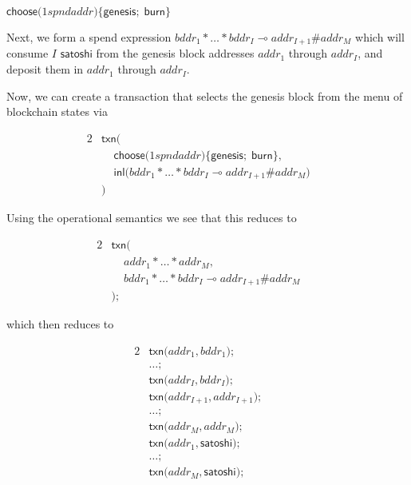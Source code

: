 \documentclass[]{acm_proc_article-sp}
\numberwithin{equation}{subsection}
\begin{document}
$\mathsf{choose}\mathsf{(} 1spndaddr \mathsf{)}\mathsf{\{} \mathsf{genesis}\mathsf{;}\; \mathsf{burn} \mathsf{\}}$

Next, we form a spend expression $bddr_1 * \ldots * bddr_I \multimap addr_{I+1} \# addr_M$ which will consume $I$ $\mathsf{satoshi}$ from the genesis block addresses $addr_1$ through $addr_I$, and deposit them in $addr_1$ through $addr_I$.

Now, we can create a transaction that selects the genesis block from
the menu of blockchain states via

\begin{alignat*}{2}
  &\mathsf{txn}\mathsf{(} && \\
  &\;\;\;\;\mathsf{choose}\mathsf{(} 1spndaddr \mathsf{)}\mathsf{\{} \mathsf{genesis}\mathsf{;}\; \mathsf{burn} \mathsf{\}}, && \\
  &\;\;\;\;\mathsf{inl}\mathsf{(} bddr_1 * \ldots * bddr_I \multimap addr_{I+1} \# addr_M \mathsf{)} && \\
  &\mathsf{)}
\end{alignat*}

Using the operational semantics we see that this reduces to

\begin{alignat*}{2}
  & \mathsf{txn}\mathsf{(} && \\
  & \;\;\;\; addr_1 * \ldots * addr_M, && \\
  & \;\;\;\; bddr_1 * \ldots * bddr_I \multimap addr_{I+1} \# addr_M && \\
  & \mathsf{)} \mathsf{;}
\end{alignat*} 


which then reduces to

\begin{alignat*}{2}
  &\mathsf{txn}\mathsf{(} addr_1, bddr_1 \mathsf{)} \mathsf{;} && \\
  &\ldots \mathsf{;} && \\
  &\mathsf{txn}\mathsf{(} addr_I, bddr_I \mathsf{)} \mathsf{;} && \\
  &\mathsf{txn}\mathsf{(} addr_{I+1}, addr_{I+1} \mathsf{)} \mathsf{;} && \\
  &\ldots \mathsf{;} && \\
  &\mathsf{txn}\mathsf{(} addr_M, addr_M \mathsf{)} \mathsf{;} && \\
  &\mathsf{txn}\mathsf{(} addr_1, \mathsf{satoshi} \mathsf{)} \mathsf{;} && \\
  &\ldots \mathsf{;} && \\
  &\mathsf{txn}\mathsf{(} addr_M, \mathsf{satoshi} \mathsf{)} \mathsf{;} &&
\end{alignat*}
\end{document}
